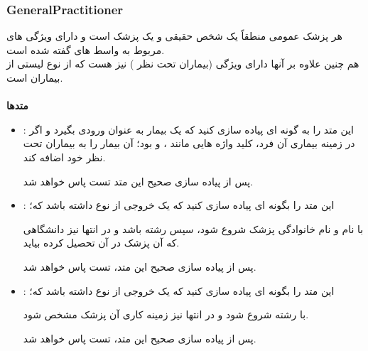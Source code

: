         \subsubsection{GeneralPractitioner}
        هر پزشک عمومی منطقاً یک شخص حقیقی و یک پزشک است و دارای ویژگی های مربوط به 
        واسط های گفته شده
        است.
        \\
        هم چنین علاوه بر آنها دارای ویژگی 
        (بیماران تحت نظر )
        نیز هست که از نوع لیستی از بیماران است.
        \\
        \\
        \textbf{متدها}
        \begin{itemize}
        \item 
            \grayBox{\textcolor{orange}{Acceptable}}
            :
            این متد
            را به گونه ای پیاده سازی کنید که یک بیمار به عنوان ورودی بگیرد و اگر در زمینه بیماری آن فرد، 
            کلید واژه هایی مانند 
            \grayBox{\textcolor{red}{Cough}}
            ،
            \grayBox{\textcolor{red}{Sneezing}}
            و
            \grayBox{\textcolor{red}{throat Sore}}
            بود؛ آن بیمار را به بیماران تحت نظر خود اضافه کند.
            
            پس از پیاده سازی صحیح این متد تست
            \grayBox{\textcolor{dkgreen}{AddingPatientsToGeneralPractitioner}}
            پاس خواهد شد.

        \item
            \grayBox{\textcolor{orange}{GraduatedFrom}}
            :
            این متد را بگونه ای پیاده سازی کنید که یک خروجی از نوع 
            \grayBox{\textcolor{blue}{string}}
            داشته باشد که؛
            
            با نام و نام خانوادگی پزشک شروع شود، سپس رشته 
            باشد و در انتها نیز دانشگاهی که آن پزشک در آن تحصیل کرده بیاید.
            
            پس از پیاده سازی صحیح این متد، تست
            \grayBox{\textcolor{dkgreen}{GraduatingGenerals}}
            پاس خواهد شد.
            
        \item
            \grayBox{\textcolor{orange}{Work}}
            :
            این متد را بگونه ای پیاده سازی کنید که یک خروجی از نوع 
            \grayBox{\textcolor{blue}{string}}
            داشته باشد که؛
            
            با رشته
            شروع شود و در انتها نیز زمینه کاری آن پزشک مشخص شود.
            
            پس از پیاده سازی صحیح این متد، تست
            \grayBox{\textcolor{dkgreen}{WorkingGenerals}}
            پاس خواهد شد.
        \end{itemize}
        
